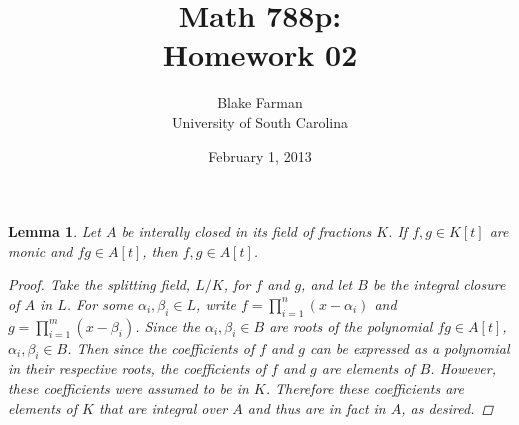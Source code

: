 \documentclass[10pt]{amsart}
\author{Blake Farman\\University of South Carolina}
\title{Math 788p:\\Homework 02}
\date{February 1, 2013}
\begin{document}
\maketitle

\providecommand{\p}{\mathfrak{p}}
\providecommand{\m}{\mathfrak{m}}

\newtheorem{thm}{}
\newtheorem{lem}{Lemma}

\setcounter{thm}{1}

\begin{lem}\label{lem1}
  Let $A$ be interally closed in its field of fractions $K$.
  If $f, g \in K[t]$ are monic and $fg \in A[t]$, then $f, g \in A[t]$.
  
  \begin{proof}
    Take the splitting field, $L/K$, for $f$ and $g$, and let $B$ be the integral closure of $A$ in $L$.
    For some $\alpha_i, \beta_i \in L$, write $f = \prod_{i=1}^n (x - \alpha_i)$ and $g = \prod_{i=1}^m (x - \beta_i)$.
    Since the $\alpha_i, \beta_i \in B$ are roots of the polynomial $fg \in A[t]$, $\alpha_i, \beta_i \in B$.
    Then since the coefficients of $f$ and $g$ can be expressed as a polynomial in their respective roots, the coefficients of $f$ and $g$ are elements of $B$.
    However, these coefficients were assumed to be in $K$.
    Therefore these coefficients are elements of $K$ that are integral over $A$ and thus are in fact in $A$, as desired.
  \end{proof}
\end{lem}
\end{document}
